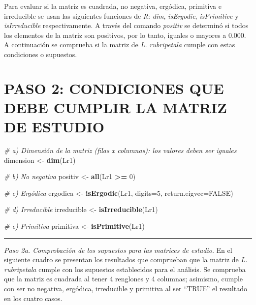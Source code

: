 \documentclass[
]{book}
\newenvironment{Shaded}{\begin{snugshade}}{\end{snugshade}}
\newcommand{\AttributeTok}[1]{\textcolor[rgb]{0.13,0.29,0.53}{#1}}
\newcommand{\CommentTok}[1]{\textcolor[rgb]{0.56,0.35,0.01}{\textit{#1}}}
\newcommand{\ConstantTok}[1]{\textcolor[rgb]{0.56,0.35,0.01}{#1}}
\newcommand{\DecValTok}[1]{\textcolor[rgb]{0.00,0.00,0.81}{#1}}
\newcommand{\FunctionTok}[1]{\textcolor[rgb]{0.13,0.29,0.53}{\textbf{#1}}}
\newcommand{\NormalTok}[1]{#1}
\newcommand{\OtherTok}[1]{\textcolor[rgb]{0.56,0.35,0.01}{#1}}
\newcommand{\SpecialCharTok}[1]{\textcolor[rgb]{0.81,0.36,0.00}{\textbf{#1}}}
\theoremstyle{definition}
\theoremstyle{definition}
\theoremstyle{definition}
\theoremstyle{definition}
\theoremstyle{remark}
\begin{document}
Para evaluar si la matriz es cuadrada, no negativa, ergódica, primitiva e irreducible se usan las siguientes funciones de \emph{R}: \emph{dim}, \emph{isErgodic}, \emph{isPrimitive} y \emph{isIrreducible} respectivamente. A través del comando \emph{positiv} se determinó si todos los elementos de la matriz son positivos, por lo tanto, iguales o mayores a 0.000. A continuación se comprueba si la matriz de \emph{L. rubripetala} cumple con estas condiciones o supuestos.

\section{PASO 2: CONDICIONES QUE DEBE CUMPLIR LA MATRIZ DE ESTUDIO}\label{paso-2-condiciones-que-debe-cumplir-la-matriz-de-estudio}

\begin{Shaded}
\begin{Highlighting}[]
\CommentTok{\# a) Dimensión de la matriz (filas x columnas): los valores deben ser iguales}
\NormalTok{dimension }\OtherTok{\textless{}{-}} \FunctionTok{dim}\NormalTok{(Lr1)}

\CommentTok{\# b) No negativa }
\NormalTok{positiv }\OtherTok{\textless{}{-}} \FunctionTok{all}\NormalTok{(Lr1 }\SpecialCharTok{\textgreater{}=} \DecValTok{0}\NormalTok{)}

\CommentTok{\# c) Ergódica}
\NormalTok{ergodica }\OtherTok{\textless{}{-}} \FunctionTok{isErgodic}\NormalTok{(Lr1, }\AttributeTok{digits=}\DecValTok{5}\NormalTok{, }\AttributeTok{return.eigvec=}\ConstantTok{FALSE}\NormalTok{)}

\CommentTok{\# d) Irreducible}
\NormalTok{irreducible }\OtherTok{\textless{}{-}} \FunctionTok{isIrreducible}\NormalTok{(Lr1)}

\CommentTok{\# e) Primitiva}
\NormalTok{primitiva }\OtherTok{\textless{}{-}} \FunctionTok{isPrimitive}\NormalTok{(Lr1)}
\end{Highlighting}
\end{Shaded}

\begin{center}\rule{0.5\linewidth}{0.5pt}\end{center}

\emph{Paso 2a. Comprobación de los supuestos para las matrices de estudio}. En el siguiente cuadro se presentan los resultados que comprueban que la matriz de \emph{L. rubripetala} cumple con los supuestos establecidos para el análisis. Se comprueba que la matriz es cuadrada al tener 4 renglones y 4 columnas; asimismo, cumple con ser no negativa, ergódica, irreducible y primitiva al ser ``TRUE'' el resultado en los cuatro casos.
\end{document}
